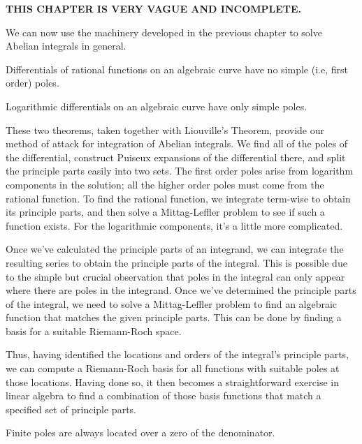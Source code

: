 

{\bf THIS CHAPTER IS VERY VAGUE AND INCOMPLETE.}

We can now use the machinery developed in the previous chapter to
solve Abelian integrals in general.

\theorem
Differentials of rational functions on an algebraic curve have no
simple (i.e, first order) poles.
\endtheorem

\theorem
Logarithmic differentials on an algebraic curve have only simple
poles.
\endtheorem

These two theorems, taken together with Liouville's Theorem, provide
our method of attack for integration of Abelian integrals.  We find
all of the poles of the differential, construct Puiseux expansions of
the differential there, and split the principle parts easily into two
sets.  The first order poles arise from logarithm components in the
solution; all the higher order poles must come from the rational
function.  To find the rational function, we integrate term-wise to
obtain its principle parts, and then solve a Mittag-Leffler problem to
see if such a function exists.  For the logarithmic components,
it's a little more complicated.

Once we've calculated the principle parts of an integrand, we can
integrate the resulting series to obtain the principle parts of the
integral.  This is possible due to the simple but crucial observation
that poles in the integral can only appear where there are poles in
the integrand.  Once we've determined the principle parts of the
integral, we need to solve a Mittag-Leffler problem to find an
algebraic function that matches the given principle parts.  This can
be done by finding a basis for a suitable Riemann-Roch space.

Thus, having identified the
locations and orders of the integral's principle parts, we can compute
a Riemann-Roch basis for all functions with suitable poles at those
locations.  Having done so, it then becomes a straightforward exercise
in linear algebra to find a combination of those basis functions
that match a specified set of principle parts.

\theorem
Finite poles are always located over a zero of the denominator.
\endtheorem

\begin{comment}
The techniques of the previous chapter suffice to compute the {\it
algebraic} portion of an Abelian integral, which is to say, an
algebraic function.  Liouville's theorem, however, tells us that there
can also be logarithmic components in the integral.  The two can be
easily separated, since the rational portion of the integral
corresponds to poles of second order poles and higher in the integrand,
while the logarithmic portion corresponds to first order poles
in the integrand.
\end{comment}

